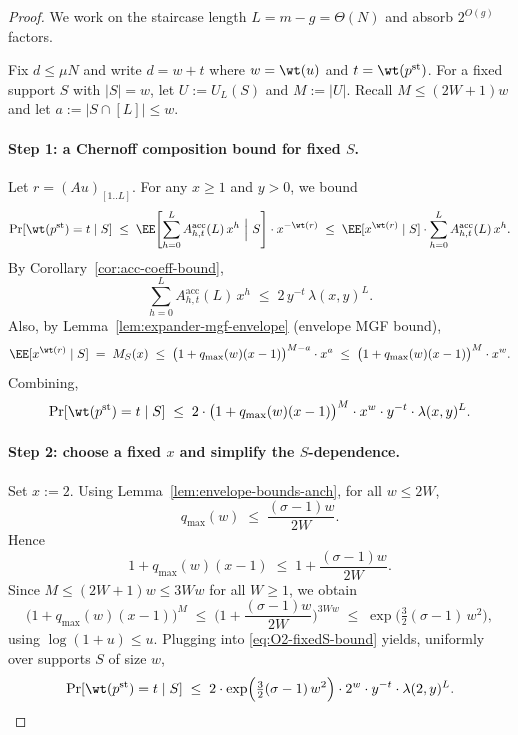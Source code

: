 \begin{proof}
We work on the staircase length $L=m-g=\Theta(N)$ and absorb $2^{O(g)}$ factors.

Fix $d\le \mu N$ and write $d=w+t$ where $w=\wt(u)$ and $t=\wt(p^{\mathrm{st}})$.
For a fixed support $S$ with $|S|=w$, let $U:=U_L(S)$ and $M:=|U|$.
Recall $M\le (2W+1)w$ and let $a:=|S\cap[L]|\le w$.

\paragraph{Step 1: a Chernoff composition bound for fixed $S$.}
Let $r=(Au)_{[1..L]}$.
For any $x\ge 1$ and $y>0$, we bound
\[
\Pr[\wt(p^{\mathrm{st}})=t\mid S]
\;\le\;
\EE\!\left[\sum_{h=0}^{L} A^{\mathrm{acc}}_{h,t}(L)\,x^{h}\ \Big|\ S\right]\cdot x^{-\wt(r)}
\;\le\;
\EE[x^{\wt(r)}\mid S]\cdot \sum_{h=0}^{L} A^{\mathrm{acc}}_{h,t}(L)\,x^{h}.
\]
By Corollary~\ref{cor:acc-coeff-bound},
\[
\sum_{h=0}^{L} A^{\mathrm{acc}}_{h,t}(L)\,x^{h}
\;\le\;
2\,y^{-t}\,\lambda(x,y)^{L}.
\]
Also, by Lemma~\ref{lem:expander-mgf-envelope} (envelope MGF bound),
\[
\EE[x^{\wt(r)}\mid S]
\;=\;
M_S(x)
\;\le\;
\big(1+q_{\max}(w)(x-1)\big)^{M-a}\cdot x^{a}
\;\le\;
\big(1+q_{\max}(w)(x-1)\big)^{M}\cdot x^{w}.
\]
Combining,
\begin{equation}
\Pr[\wt(p^{\mathrm{st}})=t\mid S]
\;\le\;
2\cdot \big(1+q_{\max}(w)(x-1)\big)^{M}\cdot x^{w}\cdot y^{-t}\cdot \lambda(x,y)^{L}.
\label{eq:O2-fixedS-bound}
\end{equation}

\paragraph{Step 2: choose a fixed $x$ and simplify the $S$-dependence.}
Set $x:=2$.
Using Lemma~\ref{lem:envelope-bounds-anch}, for all $w\le 2W$,
\[
q_{\max}(w)\;\le\;\frac{(\sigma-1)w}{2W}.
\]
Hence
\[
1+q_{\max}(w)(x-1)
\;\le\;
1+\frac{(\sigma-1)w}{2W}.
\]
Since $M\le (2W+1)w \le 3Ww$ for all $W\ge 1$, we obtain
\[
\big(1+q_{\max}(w)(x-1)\big)^{M}
\;\le\;
\Big(1+\frac{(\sigma-1)w}{2W}\Big)^{3Ww}
\;\le\;
\exp\!\Big(\tfrac{3}{2}(\sigma-1)\,w^{2}\Big),
\]
using $\log(1+u)\le u$.
Plugging into \eqref{eq:O2-fixedS-bound} yields, uniformly over supports $S$ of size $w$,
\begin{equation}
\Pr[\wt(p^{\mathrm{st}})=t\mid S]
\;\le\;
2\cdot \exp\!\Big(\tfrac{3}{2}(\sigma-1)\,w^{2}\Big)\cdot 2^{w}\cdot y^{-t}\cdot \lambda(2,y)^{L}.
\label{eq:O2-unifS-bound}
\end{equation}


\end{proof}

